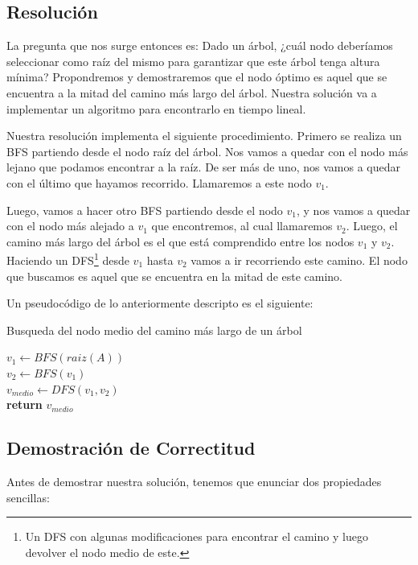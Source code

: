 \subsection{Resolución}

La pregunta que nos surge entonces es: Dado un árbol, ¿cuál nodo deberíamos seleccionar como raíz del mismo para garantizar que este árbol tenga altura mínima? Propondremos y demostraremos que el nodo óptimo es aquel que se encuentra a la mitad del camino más largo del árbol. Nuestra solución va a implementar un algoritmo para encontrarlo en
tiempo lineal. 

Nuestra resolución implementa el siguiente procedimiento. Primero se realiza un BFS partiendo desde el nodo raíz del árbol. Nos vamos a quedar con el nodo más lejano que podamos encontrar a la raíz. De ser más de uno, nos vamos a quedar con el último que hayamos recorrido. Llamaremos a este nodo $v_1$.

Luego, vamos a hacer otro BFS partiendo desde el nodo $v_1$, y nos vamos a quedar con el nodo más alejado a $v_1$ que encontremos, al cual llamaremos $v_2$. Luego, el camino más largo del árbol es el que está comprendido entre los nodos $v_1$ y $v_2$. Haciendo un DFS\footnote{Un DFS con algunas modificaciones para encontrar el camino y luego devolver el nodo medio de este.} desde $v_1$ hasta $v_2$ vamos a ir recorriendo este camino. El nodo que buscamos es aquel que se encuentra en la mitad de este camino.

\newpage
Un pseudocódigo de lo anteriormente descripto es el siguiente:\\

\begin{algorithm}[H]
	\caption{Busqueda del nodo medio del camino más largo de un árbol}
	$v_1 \longleftarrow BFS(raiz(A))$\\
	$v_2 \longleftarrow BFS(v_1)$\\
	$v_{medio} \longleftarrow DFS(v_1,v_2)$\\
	\textbf{return} $v_{medio}$\\
\end{algorithm}

\subsection{Demostración de Correctitud}

Antes de demostrar nuestra solución, tenemos que enunciar dos propiedades sencillas:\\

